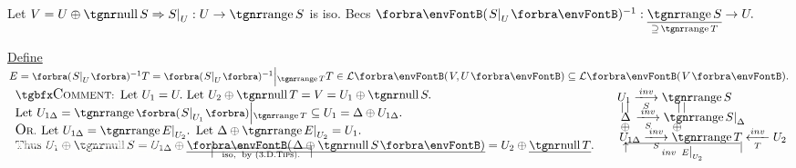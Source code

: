 \par\quad
Let $V=U\oplus\null S\Rightarrow S\mmid_U:U\rightarrow\range S$ is iso. Becs $\Par{S\mmid_U}{^{-1}}:\underset{\supseteq\,\range T}{\uline{\range S}}\rightarrow U.$\par\vspace{-12pt}\quad
\uline{Define $E=\BigPar{S\mmid_U}{^{-1}}T=\BigPar{S\mmid_U}{^{-1}}\Big|{_{\range T}}T\in\Lm{V,U}\subseteq\Lm{V}.$}\PfEnd\vspace{10pt}\quad
\!\!\!$\hText{$
	\Comment \,\,\,Let $U_1=U.$ Let $U_2\oplus\null T=V=U_1\oplus\null S.\\$
	Let $U_{1\Delta}=\range\BigPar{S\mmid_{U_1}}\Big|{_{\range T}}\subseteq U_1=\Delta\oplus U_{1\Delta}.\\$
	\Or Let $U_{1\Delta}=\range E\mmid_{U_2}.$ \,Let $\Delta\oplus\range E\mmid_{U_2}=U_1.\\$
	Thus $U_1\oplus\null S=U_{1\Delta}\oplus{}$\uline{$\Par{\Delta\oplus\null S}$}${}=U_2\oplus{}$\uline{$\null T$}$.\\[-7pt]$
	\Blind{Thus $U_1\oplus\null S=U_{1\Delta}\oplus{}$}$\qquad|\qquad\qquad\qquad\qquad|\\[-19pt]$
	\Blind{Thus $U_1\oplus\null S=U_{1\Delta}\oplus{}$}$\qquad\hspace{1pt}\underset{\text{iso, \;by (3.D.}\textsc{Tips).}}{\uline{\;\qquad\qquad\qquad\qquad\hspace{-0.5pt}}}$
$}\quad\hText{$
	$U_1\xlongrightarrow[S]{inv}\range S\\[-8pt]$
	$\;\text{\small|\:|}\qquad\qquad\text{\small|\:|}\\[-6pt]$
	$\;\Delta\,\xlongrightarrow[S]{inv}\range S\mmid_{\Delta}\\[-8pt]$
	$\;\oplus\qquad\quad\;\;\oplus\\[-6pt]$
	$\,U_{1\Delta}\xlongrightarrow[S]{inv}\range T\xlongleftarrow[T]{inv}U_2\\[-8pt]$
	$\,\;\uparrow\qquad\qquad\qquad\qquad\quad|\\[-19pt]$
	$\,\;\,\underset{inv\;\;E\def\envFontA{\normalsize}\mmid_{U_2}}{{\uline{\qquad\qquad\qquad\qquad\qquad\!\!}}}$
$}$\par\vspace{4pt}\quad
